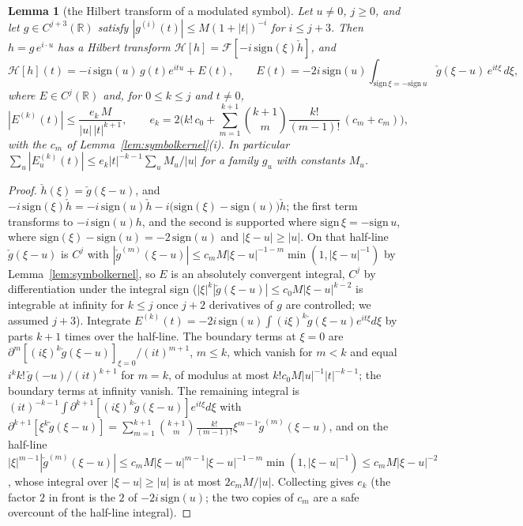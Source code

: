 \documentclass[11pt]{article}
\newtheorem{lemma}[theorem]{Lemma}
\theoremstyle{definition}
\theoremstyle{remark}
\newcommand{\R}{\mathbb{R}}
\begin{document}
\begin{lemma}[the Hilbert transform of a modulated symbol]\label{lem:hilbmod}
Let $u\ne0$, $j\ge0$, and let $g\in C^{j+3}(\R)$ satisfy $|g^{(i)}(t)|\le M(1+|t|)^{-i}$ for $i\le j+3$. Then $h=g\,e^{i\cdot u}$ has a Hilbert transform $\mathcal H[h]=\mathcal F[-i\,\mathrm{sign}(\xi)\check h]$, and
\[
\mathcal H[h](t)=-i\,\mathrm{sign}(u)\,g(t)e^{itu}+E(t),\qquad E(t)=-2i\,\mathrm{sign}(u)\int_{\mathrm{sign}\,\xi=-\mathrm{sign}\,u}\check g(\xi-u)\,e^{it\xi}\,d\xi ,
\]
where $E\in C^j(\R)$ and, for $0\le k\le j$ and $t\ne0$,
\[
|E^{(k)}(t)|\le\frac{e_k\,M}{|u|\,|t|^{k+1}},\qquad e_k=2\Big(k!\,c_0+\sum_{m=1}^{k+1}\binom{k+1}m\frac{k!}{(m-1)!}\,(c_m+c_m)\Big),
\]
with the $c_m$ of Lemma~\ref{lem:symbolkernel}(i). In particular $\sum_u|E_u^{(k)}(t)|\le e_k|t|^{-k-1}\sum_uM_u/|u|$ for a family $g_u$ with constants $M_u$.
\end{lemma}
\begin{proof}
$\check h(\xi)=\check g(\xi-u)$, and $-i\,\mathrm{sign}(\xi)\check h=-i\,\mathrm{sign}(u)\check h-i\big(\mathrm{sign}(\xi)-\mathrm{sign}(u)\big)\check h$; the first term transforms to $-i\,\mathrm{sign}(u)h$, and the second is supported where $\mathrm{sign}\,\xi=-\mathrm{sign}\,u$, where $\mathrm{sign}(\xi)-\mathrm{sign}(u)=-2\,\mathrm{sign}(u)$ and $|\xi-u|\ge|u|$. On that half-line $\check g(\xi-u)$ is $C^j$ with $|\check g^{(m)}(\xi-u)|\le c_mM|\xi-u|^{-1-m}\min(1,|\xi-u|^{-1})$ by Lemma~\ref{lem:symbolkernel}, so $E$ is an absolutely convergent integral, $C^j$ by differentiation under the integral sign ($|\xi|^k|\check g(\xi-u)|\le c_0M|\xi-u|^{k-2}$ is integrable at infinity for $k\le j$ once $j+2$ derivatives of $g$ are controlled; we assumed $j+3$). Integrate $E^{(k)}(t)=-2i\,\mathrm{sign}(u)\int(i\xi)^k\check g(\xi-u)e^{it\xi}d\xi$ by parts $k+1$ times over the half-line. The boundary terms at $\xi=0$ are $\partial^m[(i\xi)^k\check g(\xi-u)]_{\xi=0}/(it)^{m+1}$, $m\le k$, which vanish for $m<k$ and equal $i^kk!\,\check g(-u)/(it)^{k+1}$ for $m=k$, of modulus at most $k!c_0M|u|^{-1}|t|^{-k-1}$; the boundary terms at infinity vanish. The remaining integral is $(it)^{-k-1}\int\partial^{k+1}[(i\xi)^k\check g(\xi-u)]e^{it\xi}d\xi$ with $\partial^{k+1}[\xi^k\check g(\xi-u)]=\sum_{m=1}^{k+1}\binom{k+1}m\frac{k!}{(m-1)!}\xi^{m-1}\check g^{(m)}(\xi-u)$, and on the half-line $|\xi|^{m-1}|\check g^{(m)}(\xi-u)|\le c_mM|\xi-u|^{m-1}|\xi-u|^{-1-m}\min(1,|\xi-u|^{-1})\le c_mM|\xi-u|^{-2}$, whose integral over $|\xi-u|\ge|u|$ is at most $2c_mM/|u|$. Collecting gives $e_k$ (the factor $2$ in front is the $2$ of $-2i\,\mathrm{sign}(u)$; the two copies of $c_m$ are a safe overcount of the half-line integral).
\end{proof}
\end{document}
